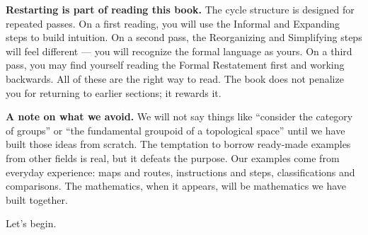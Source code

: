 \bigskip

\textbf{Restarting is part of reading this book.} The cycle structure is
designed for repeated passes. On a first reading, you will use the Informal
and Expanding steps to build intuition. On a second pass, the Reorganizing
and Simplifying steps will feel different --- you will recognize the formal
language as yours. On a third pass, you may find yourself reading the Formal
Restatement first and working backwards. All of these are the right way to
read. The book does not penalize you for returning to earlier sections; it
rewards it.

\bigskip

\textbf{A note on what we avoid.} We will not say things like ``consider the
category of groups'' or ``the fundamental groupoid of a topological space''
until we have built those ideas from scratch. The temptation to borrow
ready-made examples from other fields is real, but it defeats the purpose. Our
examples come from everyday experience: maps and routes, instructions and steps,
classifications and comparisons. The mathematics, when it appears, will be
mathematics we have built together.

\bigskip

Let's begin.
